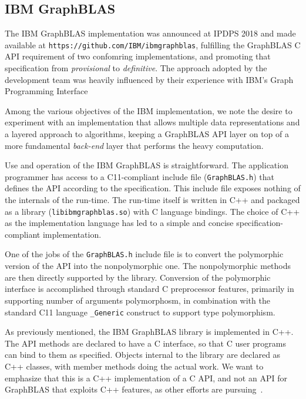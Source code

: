 \subsection{IBM GraphBLAS}

\newcommand{\code}[1]{{\tt #1}}

The IBM GraphBLAS implementation was announced at IPDPS 2018 and made
available at \code{https://github.com/IBM/ibmgraphblas}, fulfilling
the GraphBLAS C API requirement of two confomring implementations,
and promoting that specification from \emph{provisional} to
\emph{definitive}. The approach adopted by the development team was
heavily influenced by their experience with IBM's Graph Programming
Interface~\cite{gpi2016,GPI}

Among the various objectives of the IBM implementation, we note the
desire to experiment with an implementation that allows multiple data
representations and a layered approach to algorithms, keeping a GraphBLAS
API layer on top of a more fundamental \emph{back-end} layer that performs
the heavy computation.

Use and operation of the IBM GraphBLAS is straightforward.
The application programmer has access to a C11-compliant include
file (\code{GraphBLAS.h}) that defines the API according to the
specification. This include file exposes nothing of the internals of
the run-time. The run-time itself is written in C++ and packaged as a
library (\code{libibmgraphblas.so}) with C language bindings.  The choice
of C++ as the implementation language has led to a simple and concise
specification-compliant implementation.

One of the jobs of the \code{GraphBLAS.h} include file is to
convert the polymorphic version of the API into the nonpolymorphic
one. The nonpolymorphic methods are then directly supported by the
library. Conversion of the polymorphic interface is accomplished through
standard C preprocessor features, primarily in supporting number of
arguments polymorphosm, in combination with the standard C11 language
\code{\_Generic} construct to support type polymorphism.

As previously mentioned, the IBM GraphBLAS library is implemented in
C++. The API methods are declared to have a C interface, so that C user
programs can bind to them as specified. Objects internal to the library
are declared as C++ classes, with member methods doing the actual work.
We want to emphasize that this is a C++ implementation of a C API, and
not an API for GraphBLAS that exploits C++ features, as other efforts
are pursuing~\cite{gbtl-github}.

